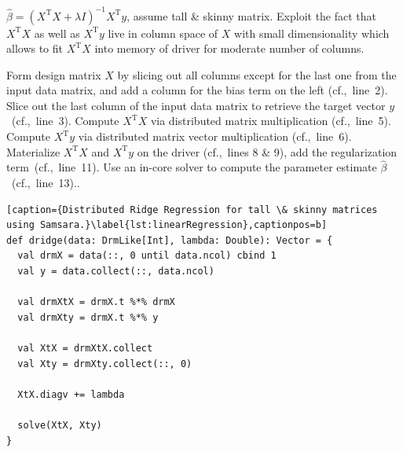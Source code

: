 \documentclass{article}
\begin{document}
$\hat{\beta} = (X^\mathrm{T}X + \lambda I)^{-1} X^\mathrm{T}y$, assume tall \& skinny matrix. Exploit the fact that $X^\mathrm{T} X$ as well as $X^\mathrm{T} y$ live in column space of $X$ with small dimensionality which allows to fit $X^\mathrm{T} X$ into memory of driver for moderate number of columns.

Form design matrix $X$ by slicing out all columns except for the last one from the input data matrix, and add a column for the bias term on the left (cf.,~line~2). Slice out the last column of the input data matrix to retrieve the target vector $y$~(cf.,~line~3). Compute $X^\mathrm{T} X$ via distributed matrix multiplication (cf.,~line~5). Compute $X^\mathrm{T}y$ via distributed matrix vector multiplication (cf.,~line~6). Materialize $X^\mathrm{T} X$  and $X^\mathrm{T} y$ on the driver (cf.,~lines 8 \& 9), add the regularization term~(cf.,~line~11). Use an in-core solver to compute the parameter estimate $\hat{\beta}$~(cf.,~line~13).. 

\begin{lstlisting}[caption={Distributed Ridge Regression for tall \& skinny matrices using Samsara.}\label{lst:linearRegression},captionpos=b] 
def dridge(data: DrmLike[Int], lambda: Double): Vector = {
  val drmX = data(::, 0 until data.ncol) cbind 1
  val y = data.collect(::, data.ncol)

  val drmXtX = drmX.t %*% drmX
  val drmXty = drmX.t %*% y

  val XtX = drmXtX.collect 
  val Xty = drmXty.collect(::, 0) 

  XtX.diagv += lambda

  solve(XtX, Xty)
}
\end{lstlisting}
\end{document}

